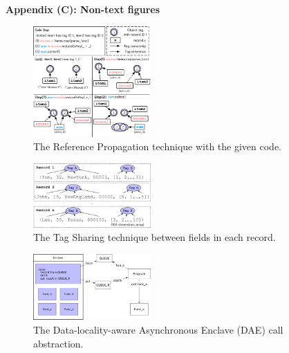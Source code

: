 \documentclass[9pt,a4]{article}
\begin{document}
\textbf{Appendix (C): Non-text figures}
\vspace{0.3in}

\begin{figure}[h]
   \center
\includegraphics[width=0.4\textwidth]{figures/reference}
\caption{The Reference Propagation technique with the given code.}
\label{fig:reference}
\end{figure}
\vspace{0.3in}

\begin{figure}[h]
   \center
\includegraphics[width=0.4\textwidth]{figures/tagcache}
\caption{The Tag Sharing technique between fields in each record.}
\label{fig:tagcache}
\end{figure}
\vspace{0.3in}

\begin{figure}[h]
   \center
   \includegraphics[width=0.4\textwidth]{figures/async_call}
 \caption{The Data-locality-aware Asynchronous Enclave (DAE) call abstraction.}
   \label{fig:async-call}
 \end{figure}

% 
% 

\end{document}

